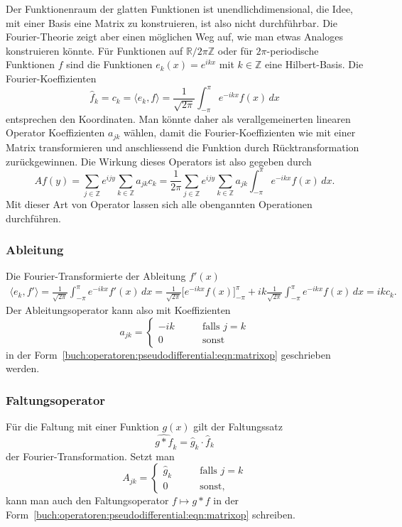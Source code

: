 Der Funktionenraum der glatten Funktionen ist unendlichdimensional, die
Idee, mit einer Basis eine Matrix zu konstruieren, ist also nicht
durchführbar.
Die Fourier-Theorie zeigt aber einen möglichen Weg auf, wie man etwas
Analoges konstruieren könnte.
Für Funktionen auf $\mathbb{R}/2\pi\mathbb{Z}$ oder für $2\pi$-periodische
Funktionen $f$ sind die Funktionen $e_k(x)=e^{ikx}$ mit $k\in\mathbb{Z}$ 
eine Hilbert-Basis.
Die Fourier-Koeffizienten
\[
\hat{f}_k
=
c_k
=
\langle e_k,f\rangle
=
\frac{1}{\!\sqrt{2\pi}}
\int_{-\pi}^{\pi} e^{-ikx}f(x)\,dx
\]
entsprechen den Koordinaten.
Man könnte daher als verallgemeinerten linearen Operator Koeffizienten
$a_{jk}$ wählen, damit die Fourier-Koeffizienten wie mit einer Matrix
transformieren und anschliessend die Funktion durch Rücktransformation
zurückgewinnen.
Die Wirkung dieses Operators ist also gegeben durch
\begin{equation}
Af(y)
=
\sum_{j\in\mathbb{Z}}
e^{ijy}
\sum_{k\in\mathbb{Z}} a_{jk}
c_k
=
\frac{1}{2\pi}
\sum_{j\in\mathbb{Z}}
e^{ijy}
\sum_{k\in\mathbb{Z}} a_{jk}
\int_{-\pi}^\pi e^{-ikx} f(x)\,dx.
\label{buch:operatoren:pseudodifferential:eqn:matrixop}
\end{equation}
Mit dieser Art von Operator lassen sich alle obengannten Operationen
durchführen.

\subsubsection{Ableitung}
Die Fourier-Transformierte der Ableitung $f'(x)$
\begin{align*}
\langle e_k,f'\rangle
=
\frac{1}{\!\sqrt{2\pi}}
\int_{-\pi}^\pi e^{-ikx}f'(x)\,dx
=
\frac{1}{\!\sqrt{2\pi}}
\biggl[
e^{-ikx}
f(x)
\biggr]_{-\pi}^\pi
+ik
\frac{1}{\!\sqrt{2\pi}}
\int_{-\pi}^\pi e^{-ikx} f(x)\,dx
=
ikc_k.
\end{align*}
Der Ableitungsoperator kann also mit Koeffizienten
\[
a_{jk}
=
\begin{cases}
-ik&\qquad\text{falls $j=k$}\\
0  &\qquad\text{sonst}
\end{cases}
\]
in der Form~\eqref{buch:operatoren:pseudodifferential:eqn:matrixop}
geschrieben werden.

\subsubsection{Faltungsoperator}
Für die Faltung mit einer Funktion $g(x)$ gilt der Faltungssatz
\[
\widehat{g*f}_k
=
\hat{g}_k\cdot \hat{f}_k
\]
der Fourier-Transformation.
Setzt man
\[
A_{jk}
=
\begin{cases}
\hat{g}_k&\qquad\text{falls $j=k$}\\
0        &\qquad\text{sonst,}
\end{cases}
\]
kann man auch den Faltungsoperator $f\mapsto g*f$ in der 
Form~\eqref{buch:operatoren:pseudodifferential:eqn:matrixop}
schreiben.

